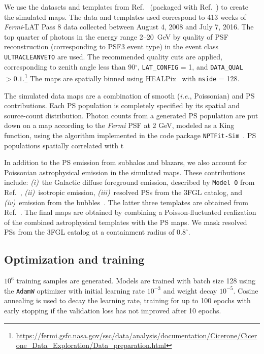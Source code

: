 \documentclass[prd,aps,10pt,nofootinbib,twocolumn,superscriptaddress,preprintnumbers,balancelastpage,longbibliography]{revtex4-1}
\begin{document}
We use the datasets and templates from Ref.~\cite{rodd_nicholas_safdi_siddharth_2016} (packaged with Ref.~\cite{Mishra-Sharma:2016gis}) to create the simulated maps. The data and templates used correspond to 413 weeks of \emph{Fermi}-LAT Pass 8 data collected between August 4, 2008 and July 7, 2016. The top quarter of photons in the energy range 2--20~GeV by quality of PSF reconstruction (corresponding to PSF3 event type) in the event class \texttt{ULTRACLEANVETO} are used. The recommended quality cuts are applied, corresponding to zenith angle less than 90$^\circ$, \texttt{LAT\_CONFIG} = 1, and \texttt{DATA\_QUAL} $> 0.1$.\footnote{\url{https://fermi.gsfc.nasa.gov/ssc/data/analysis/documentation/Cicerone/Cicerone_Data_Exploration/Data_preparation.html}} The maps are spatially binned using HEALPix~\cite{Gorski:2004by} with \texttt{nside} = 128.

The simulated data maps are a combination of smooth (\emph{i.e.}, Poissonian) and PS contributions. Each PS population is completely specified by its spatial and source-count distribution. Photon counts from a generated PS population are put down on a map according to the \emph{Fermi} PSF at 2 GeV, modeled as a King function, using the algorithm implemented in the code package \texttt{NPTFit-Sim}~\cite{NPTFit-Sim}. PS populations spatially correlated with t

In addition to the PS emission from subhalos and blazars, we also account for Poissonian astrophysical emission in the simulated maps.  These contributions include: \emph{(i)}~the Galactic diffuse foreground emission, described by \texttt{Model~O} from Ref.~\cite{Buschmann:2020adf}, \emph{(ii)}~isotropic emission, \emph{(iii)}~resolved PSs from the 3FGL catalog, and \emph{(iv)}~emission from the \Fermi bubbles~\cite{Su:2010qj}. The latter three templates are obtained from Ref.~\cite{rodd_nicholas_safdi_siddharth_2016}. The final maps are obtained by combining a Poisson-fluctuated realization of the combined astrophysical templates with the PS maps. We mask resolved PSs from the 3FGL catalog at a containment radius of $0.8^\circ$.   

\subsection{Optimization and training}

$10^{6}$ training samples are generated. Models are trained with batch size 128 using the \texttt{AdamW} optimizer with initial learning rate $10^{-3}$ and weight decay $10^{-5}$. Cosine annealing is used to decay the learning rate, training for up to 100 epochs with early stopping if the validation loss has not improved after 10 epochs.
\end{document}
